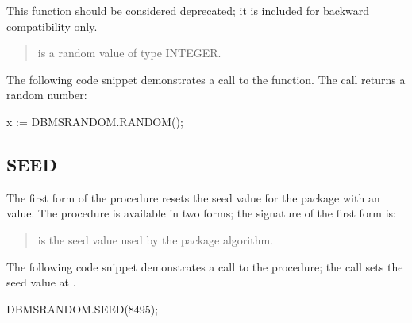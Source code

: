 \documentclass[letterpaper,10pt,english,openany,oneside]{sphinxmanual}
\begin{document}
This function should be considered deprecated; it is included for
backward compatibility only.


\begin{quote}

 is a random value of type INTEGER.
\end{quote}


The following code snippet demonstrates a call to the  function.
The call returns a random number:

%
\begin{sphinxVerbatim}[commandchars=\\\{\}]
x := DBMS\PYGZus{}RANDOM.RANDOM();
\end{sphinxVerbatim}


\subsection{SEED}
\label{\detokenize{dbms_random:seed}}
The first form of the  procedure resets the seed value for the
 package with an  value. The  procedure is
available in two forms; the signature of the first form is:
\begin{quote}

\end{quote}


\begin{quote}

 is the seed value used by the  package algorithm.
\end{quote}


The following code snippet demonstrates a call to the  procedure;
the call sets the seed value at .

%
\begin{sphinxVerbatim}[commandchars=\\\{\}]
DBMS\PYGZus{}RANDOM.SEED(8495);
\end{sphinxVerbatim}
\end{document}
